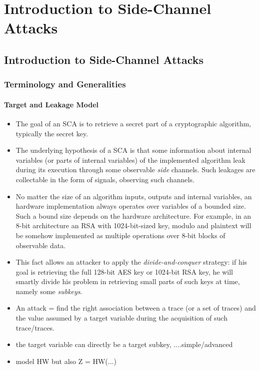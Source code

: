 \chapter{Introduction to Side-Channel Attacks} %

\label{ChapterIntroductionSCA}


\section{Introduction to Side-Channel Attacks}

\subsection{Terminology and Generalities}
\subsubsection{Target and Leakage Model}
\begin{itemize}
\item The goal of an SCA is to retrieve a secret part of a cryptographic algorithm, typically the secret key.
\item The underlying hypothesis of a SCA is that some information about internal variables (or parts of internal variables) of the implemented algorithm leak during its execution through some observable \emph{side} channels. Such leakages are collectable in the form of signals, observing such channels. 
\item No matter the size of an algorithm inputs, outputs and internal variables, an hardware implementation  always operates over variables of a bounded size. Such a bound size depends on the hardware architecture. For example, in an 8-bit architecture an RSA with 1024-bit-sized key, modulo and plaintext will be somehow implemented as multiple operations over 8-bit blocks of observable data. 
\item This fact allows an attacker to apply the \emph{divide-and-conquer} strategy: if his goal is retrieving the full 128-bit AES key or 1024-bit RSA key, he will smartly divide his problem in retrieving small parts of such keys at time, namely some \emph{subkeys}.  
\item An attack = find the right association between a trace (or a set of traces) and the value assumed by a target variable during the acquisition of such trace/traces. 
\item the target variable can directly be a target subkey, ....simple/advanced
\item model HW but also Z = HW(...)

\end{itemize}

